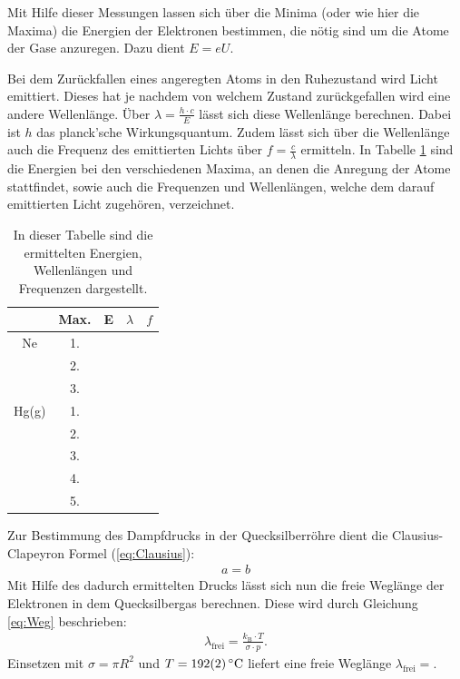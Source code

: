 	Mit Hilfe dieser Messungen lassen sich über die Minima (oder wie hier die Maxima) die Energien der Elektronen bestimmen, die nötig sind um die Atome der Gase anzuregen.
	Dazu dient $E=eU$. 
	
	Bei dem Zurückfallen eines angeregten Atoms in den Ruhezustand wird Licht emittiert. 
	Dieses hat je nachdem von welchem Zustand zurückgefallen wird eine andere Wellenlänge. 
	Über $\lambda = \frac{h \cdot c}{E}$ lässt sich diese Wellenlänge berechnen.
	Dabei ist $h$ das planck'sche Wirkungsquantum.
	Zudem lässt sich über die Wellenlänge auch die Frequenz des emittierten Lichts über $f = \frac{c}{\lambda}$ ermitteln. 
	In Tabelle \ref{tab:Werte} sind die Energien bei den verschiedenen Maxima, an denen die Anregung der Atome stattfindet, sowie auch die Frequenzen und Wellenlängen, welche dem darauf emittierten Licht zugehören, verzeichnet.
	\begin{table}
		\caption{In dieser Tabelle sind die ermittelten Energien, Wellenlängen und Frequenzen dargestellt.}
		\label{tab:Werte}
		\centering
		\begin{tabular}{c|c|c|c|c}
			& Max. & E & $\lambda$ & $f$ \\			
			\hline		
			Ne 	& 1. & & & \\
				& 2. & & & \\
				& 3. & & & \\
			\hline
			Hg(g) 	& 1. & & & \\
					& 2. & & & \\
					& 3. & & & \\
					& 4. & & & \\
					& 5. & & & \\					
		\end{tabular}
	\end{table}

	Zur Bestimmung des Dampfdrucks in der Quecksilberröhre dient die Clausius-Clapeyron Formel (\ref{eq:Clausius}):
	\begin{align} \label{eq:Clausius}
		a = b	%
	\end{align}
	Mit Hilfe des dadurch ermittelten Drucks lässt sich nun die freie Weglänge der Elektronen in dem Quecksilbergas berechnen. 
	Diese wird durch Gleichung \ref{eq:Weg} beschrieben:
	\begin{align} \label{eq:Weg}
		\lambda_\text{frei} = \frac{k_\text{B}\cdot T}{\sigma\cdot p}.
	\end{align}
 	Einsetzen mit $\sigma = \pi R^2$ und $T = \SI{192+-2}{\celsius}$ liefert eine freie Weglänge $\lambda_\text{frei} =$. %

